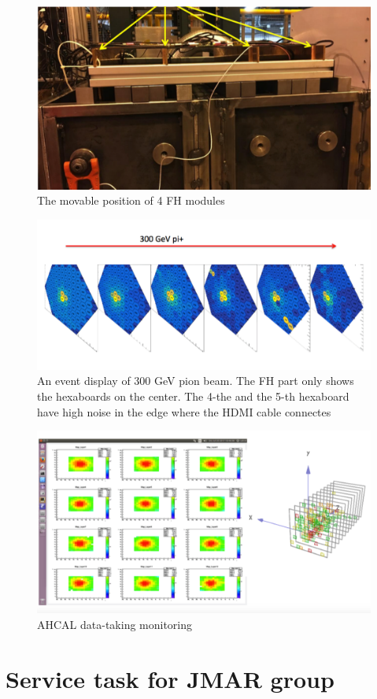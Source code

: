 \documentclass{article}
\begin{document}
\begin{figure}
\centering
\includegraphics[width=.7\textwidth]{figures/2017JulyTestBeam_FH_position.pdf}
\caption{The movable position of 4 FH modules}
\label{pics:blablabla}
\end{figure}

\begin{figure}
\centering
\includegraphics[width=.7\textwidth]{figures/2017JulyTestBeam_eventDisplay.pdf}
\caption{An event display of 300 GeV pion beam. The FH part only shows the hexaboards on the center. The 4-the and the 5-th hexaboard have high noise in the edge where the HDMI cable connectes}
\label{pics:blablabla}
\end{figure}

\begin{figure}
\centering
\includegraphics[width=.7\textwidth]{figures/2017JulyTestBeam_AHCAL_DataTaking.pdf}
\caption{AHCAL data-taking monitoring}
\label{pics:blablabla}
\end{figure}



\section{Service task for JMAR group}
\end{document}
